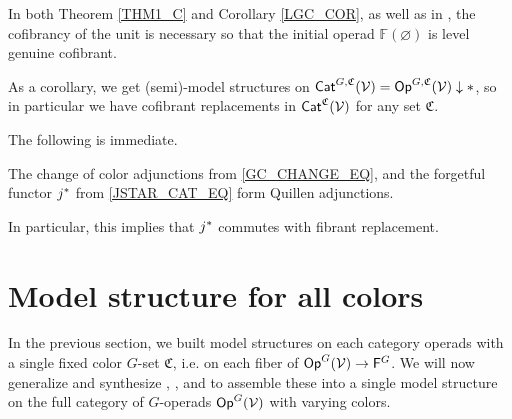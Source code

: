 \documentclass[a4paper,10pt
,draft
]{article}%
\renewcommand{\1}{\eta}%
\begin{document}
In both Theorem \ref{THM1_C} and Corollary \ref{LGC_COR}, as well as in \cite{BP_geo},
the cofibrancy of the unit is necessary so that the initial operad $\mathbb F(\varnothing)$ is level genuine cofibrant.

\begin{remark}
      \label{CATV_MC_REM}
      As a corollary, we get (semi)-model structures on $\Cat^{G, \mathfrak C}(\V) = \Op^{G, \mathfrak C}(\V) \downarrow \**$,
      so in particular we have cofibrant replacements in $\mathsf{Cat}^{\mathfrak C}(\mathcal V)$ for any set $\mathfrak C$.
\end{remark}










The following is immediate.
\begin{corollary}
      \label{COLOR_CHANGE_Q_COR}
      The change of color adjunctions from \eqref{GC_CHANGE_EQ},
      and the forgetful functor $j^{\**}$ from \eqref{JSTAR_CAT_EQ}
      form Quillen adjunctions.
\end{corollary}

\begin{remark}
      In particular, this implies that $j^{\**}$ commutes with fibrant replacement.
\end{remark}





















\newpage

\section{Model structure for all colors}
\label{MS_SEC}
\renewcommand{\C}{\mathfrak C}


In the previous section, we built model structures on each category operads with a single fixed color $G$-set $\mathfrak C$,
i.e. on each fiber of $\mathsf{Op}^G(\mathcal V) \to \mathsf{F}^G$. 
We will now generalize and synthesize \cite{BM13}, \cite{Cav}, and \cite{CM13b} to assemble these
into a single model structure on the full category of $G$-operads $\mathsf{Op}^G(\mathcal V)$ with varying colors.
\end{document}
